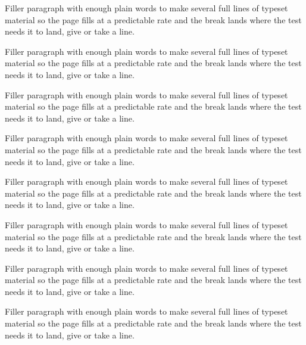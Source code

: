 \documentclass[11pt,a4paper]{article}
\begin{document}
Filler paragraph with enough plain words to make several full lines of typeset material so the page fills at a predictable rate and the break lands where the test needs it to land, give or take a line.

\enlargethispage{2\baselineskip}
Filler paragraph with enough plain words to make several full lines of typeset material so the page fills at a predictable rate and the break lands where the test needs it to land, give or take a line.

Filler paragraph with enough plain words to make several full lines of typeset material so the page fills at a predictable rate and the break lands where the test needs it to land, give or take a line.

Filler paragraph with enough plain words to make several full lines of typeset material so the page fills at a predictable rate and the break lands where the test needs it to land, give or take a line.

Filler paragraph with enough plain words to make several full lines of typeset material so the page fills at a predictable rate and the break lands where the test needs it to land, give or take a line.

Filler paragraph with enough plain words to make several full lines of typeset material so the page fills at a predictable rate and the break lands where the test needs it to land, give or take a line.

Filler paragraph with enough plain words to make several full lines of typeset material so the page fills at a predictable rate and the break lands where the test needs it to land, give or take a line.

Filler paragraph with enough plain words to make several full lines of typeset material so the page fills at a predictable rate and the break lands where the test needs it to land, give or take a line.
\end{document}
